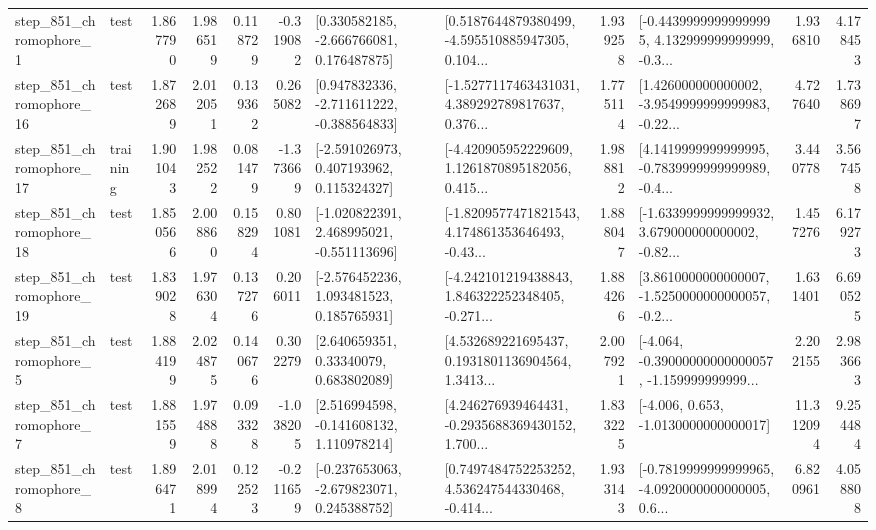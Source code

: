 \begin{tabular}{llrrrrllrlrr}
   step\_851\_chromophore\_1 &      test &      1.867790 &    1.986519 &      0.118729 & -0.319082 &    [0.330582185, -2.666766081, 0.176487875] &  [0.5187644879380499, -4.595510885947305, 0.104... &       1.939258 &  [-0.44399999999999995, 4.132999999999999, -0.3... &            1.936810 &          4.178453 \\
  step\_851\_chromophore\_16 &      test &      1.872689 &    2.012051 &      0.139362 &  0.265082 &   [0.947832336, -2.711611222, -0.388564833] &  [-1.5277117463431031, 4.389292789817637, 0.376... &       1.775114 &  [1.426000000000002, -3.9549999999999983, -0.22... &            4.727640 &          1.738697 \\
  step\_851\_chromophore\_17 &  training &      1.901043 &    1.982522 &      0.081479 & -1.373669 &    [-2.591026973, 0.407193962, 0.115324327] &  [-4.420905952229609, 1.1261870895182056, 0.415... &       1.988812 &  [4.1419999999999995, -0.7839999999999989, -0.4... &            3.440778 &          3.567458 \\
  step\_851\_chromophore\_18 &      test &      1.850566 &    2.008860 &      0.158294 &  0.801081 &   [-1.020822391, 2.468995021, -0.551113696] &  [-1.8209577471821543, 4.174861353646493, -0.43... &       1.888047 &  [-1.6339999999999932, 3.679000000000002, -0.82... &            1.457276 &          6.179273 \\
  step\_851\_chromophore\_19 &      test &      1.839028 &    1.976304 &      0.137276 &  0.206011 &    [-2.576452236, 1.093481523, 0.185765931] &  [-4.242101219438843, 1.846322252348405, -0.271... &       1.884266 &  [3.8610000000000007, -1.5250000000000057, -0.2... &            1.631401 &          6.690525 \\
   step\_851\_chromophore\_5 &      test &      1.884199 &    2.024875 &      0.140676 &  0.302279 &      [2.640659351, 0.33340079, 0.683802089] &  [4.532689221695437, 0.1931801136904564, 1.3413... &       2.007921 &  [-4.064, -0.39000000000000057, -1.159999999999... &            2.202155 &          2.983663 \\
   step\_851\_chromophore\_7 &      test &      1.881559 &    1.974888 &      0.093328 & -1.038205 &    [2.516994598, -0.141608132, 1.110978214] &  [4.246276939464431, -0.2935688369430152, 1.700... &       1.833225 &               [-4.006, 0.653, -1.0130000000000017] &           11.312094 &          9.254484 \\
   step\_851\_chromophore\_8 &      test &      1.896471 &    2.018994 &      0.122523 & -0.211659 &   [-0.237653063, -2.679823071, 0.245388752] &  [0.7497484752253252, 4.536247544330468, -0.414... &       1.933143 &  [-0.7819999999999965, -4.0920000000000005, 0.6... &            6.820961 &          4.058808 \\

\end{tabular}
